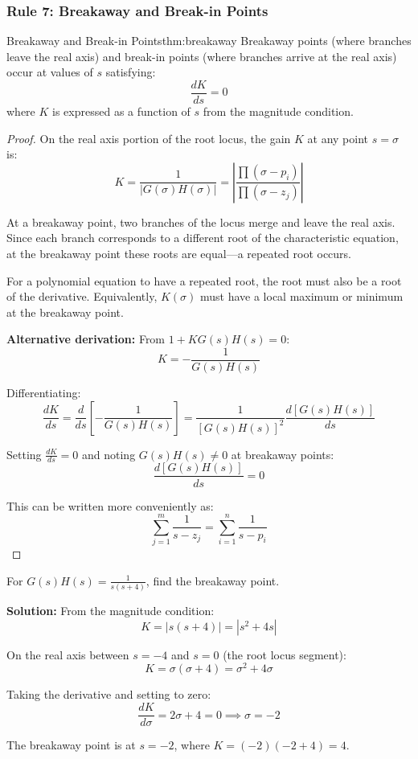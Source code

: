 \subsubsection{Rule 7: Breakaway and Break-in Points}

\begin{theorem}{Breakaway and Break-in Points}{thm:breakaway}
Breakaway points (where branches leave the real axis) and break-in points (where branches arrive at the real axis) occur at values of $s$ satisfying:
\[
\frac{dK}{ds} = 0
\]
where $K$ is expressed as a function of $s$ from the magnitude condition.
\end{theorem}

\begin{proof}
On the real axis portion of the root locus, the gain $K$ at any point $s = \sigma$ is:
\[
K = \frac{1}{|G(\sigma)H(\sigma)|} = \left|\frac{\prod(\sigma - p_i)}{\prod(\sigma - z_j)}\right|
\]

At a breakaway point, two branches of the locus merge and leave the real axis. Since each branch corresponds to a different root of the characteristic equation, at the breakaway point these roots are equal---a repeated root occurs.

For a polynomial equation to have a repeated root, the root must also be a root of the derivative. Equivalently, $K(\sigma)$ must have a local maximum or minimum at the breakaway point.

\textbf{Alternative derivation:} From $1 + KG(s)H(s) = 0$:
\[
K = -\frac{1}{G(s)H(s)}
\]

Differentiating:
\[
\frac{dK}{ds} = \frac{d}{ds}\left[-\frac{1}{G(s)H(s)}\right] = \frac{1}{[G(s)H(s)]^2}\frac{d[G(s)H(s)]}{ds}
\]

Setting $\frac{dK}{ds} = 0$ and noting $G(s)H(s) \neq 0$ at breakaway points:
\[
\frac{d[G(s)H(s)]}{ds} = 0
\]

This can be written more conveniently as:
\[
\sum_{j=1}^{m} \frac{1}{s-z_j} = \sum_{i=1}^{n} \frac{1}{s-p_i}
\]
\end{proof}

\begin{examplebox}
\label{ex:breakaway}
For $G(s)H(s) = \frac{1}{s(s+4)}$, find the breakaway point.

\textbf{Solution:} From the magnitude condition:
\[
K = |s(s+4)| = |s^2 + 4s|
\]

On the real axis between $s = -4$ and $s = 0$ (the root locus segment):
\[
K = \sigma(\sigma + 4) = \sigma^2 + 4\sigma
\]

Taking the derivative and setting to zero:
\[
\frac{dK}{d\sigma} = 2\sigma + 4 = 0 \implies \sigma = -2
\]

The breakaway point is at $s = -2$, where $K = (-2)(-2+4) = 4$.
\end{examplebox}

